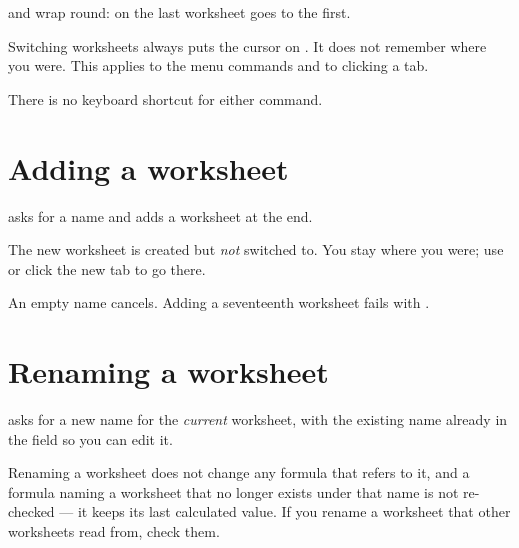  and  wrap round:  on the last
worksheet goes to the first.

\begin{ccnote}
Switching worksheets always puts the cursor on . It does not
remember where you were. This applies to the menu commands and to clicking a
tab.
\end{ccnote}

There is no keyboard shortcut for either command.

\section{Adding a worksheet}

 asks for a name and adds a worksheet at the end.

\begin{ccfigure}
\caption{Adding a worksheet}
\label{fig:sheetadd}
\end{ccfigure}

The new worksheet is created but \emph{not} switched to. You stay where you
were; use  or click the new tab to go there.

An empty name cancels. Adding a seventeenth worksheet fails with
.

\section{Renaming a worksheet}

 asks for a new name for the \emph{current}
worksheet, with the existing name already in the field so you can edit it.

Renaming a worksheet does not change any formula that refers to it, and a
formula naming a worksheet that no longer exists under that name is not
re-checked --- it keeps its last calculated value. If you rename a worksheet
that other worksheets read from, check them.


